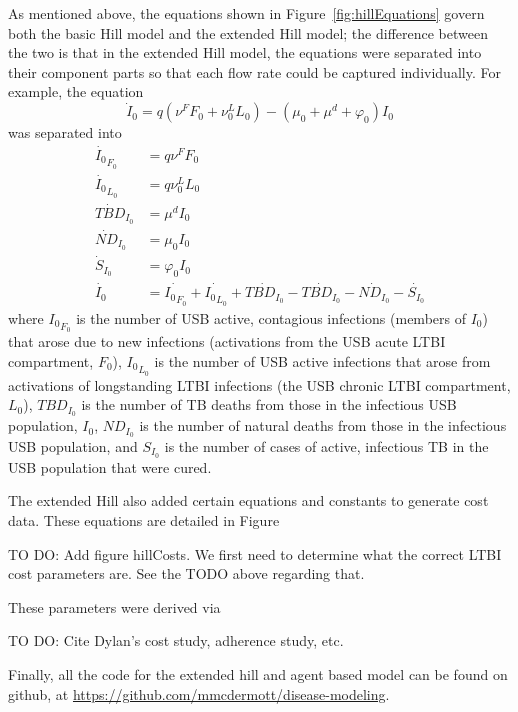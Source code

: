 \documentclass{amsart}
\renewcommand{\(}{\left(}
\renewcommand{\)}{\right)}
\newcommand{\TODO}[1]{\begin{framed}{\huge \color{red} TO DO:}
  #1 \end{framed}}
\begin{document}
As mentioned above, the equations shown in Figure~\ref{fig:hillEquations} govern
both the basic Hill model and the extended Hill model; the difference between
the two is that in the extended Hill model, the equations were separated into
their component parts so that each flow rate could be captured individually. For
example, the equation
\[\dot{I}_0 = q(\nu^FF_0 + \nu_0^LL_0) - (\mu_0+\mu^d+\varphi_0)I_0\]
was separated into 
\begin{align*}
  \dot{{I_0}}_{F_0} &= q \nu^F F_0\\
  \dot{{I_0}}_{L_0} &= q \nu_0^L L_0\\
  \dot{{TBD}}_{I_0} &= \mu^dI_0 \\
  \dot{{ND}}_{I_0}  &= \mu_0I_0 \\
  \dot{{S}}_{I_0}   &= \varphi_0 I_0\\
  \dot{I_0}         &= \dot{{I_0}_{F_0}} + \dot{{I_0}_{L_0}} +
                       \dot{{TBD}_{I_0}} - \dot{{TBD}_{I_0}} -
                       \dot{{ND}_{I_0}}  - \dot{S_{I_0}}
\end{align*}
where ${I_0}_{F_0}$ is the number of USB active, contagious infections (members
of $I_0$) that arose due to new infections (activations from the USB acute LTBI
compartment, $F_0$), ${I_0}_{L_0}$ is the number of USB active infections that
arose from activations of longstanding LTBI infections (the USB chronic LTBI
compartment, $L_0$), ${TBD}_{I_0}$ is the number of TB deaths from those in the
infectious USB population, $I_0$, $ND_{I_0}$ is the number of natural deaths
from those in the infectious USB population, and $S_{I_0}$ is the number of
cases of active, infectious TB in the USB population that were cured. 

The extended Hill also added certain equations and constants to generate cost
data. These equations are detailed in Figure~%
\TODO{Add figure hillCosts. We first need to determine what the correct LTBI
cost parameters are. See the TODO above regarding that.}
These parameters were derived via
\TODO{Cite Dylan's cost study, adherence study, etc.}

Finally, all the code for the extended hill and agent based model can be found
on github, at \url{https://github.com/mmcdermott/disease-modeling}.

\newpage


\end{document}
